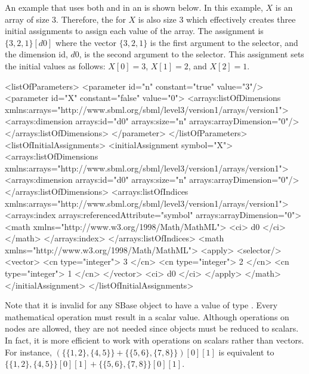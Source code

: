 An example that uses both  and  in an \InitialAssignment is shown below.   In this example, $X$ is an array of size 3.  Therefore, the \InitialAssignment for $X$ is also size 3 which effectively creates three initial assignments to assign each value of the array.  The assignment is $\{ 3, 2, 1 \}[d0]$ where the vector $\{ 3, 2, 1 \}$ is the first argument to the selector, and the \InitialAssignment dimension id, $d0$, is the second argument to the selector.  This assignment sets the initial values as follows: $X[0]=3$, $X[1]=2$, and $X[2]=1$.
\begin{example}[showstringspaces=false]
<listOfParameters>
  <parameter id="n" constant="true" value="3"/>
  <parameter id="X" constant="false" value="0">
    <arrays:listOfDimensions xmlns:arrays="http://www.sbml.org/sbml/level3/version1/arrays/version1">
      <arrays:dimension arrays:id="d0" arrays:size="n" arrays:arrayDimension="0"/>
    </arrays:listOfDimensions>
  </parameter>
</listOfParameters>
<listOfInitialAssignments>
  <initialAssignment symbol="X">
    <arrays:listOfDimensions xmlns:arrays="http://www.sbml.org/sbml/level3/version1/arrays/version1">
      <arrays:dimension arrays:id="d0" arrays:size="n" arrays:arrayDimension="0"/>
    </arrays:listOfDimensions>
    <arrays:listOfIndices xmlns:arrays="http://www.sbml.org/sbml/level3/version1/arrays/version1">
      <arrays:index arrays:referencedAttribute="symbol" arrays:arrayDimension="0">
        <math xmlns="http://www.w3.org/1998/Math/MathML">            
          <ci> d0 </ci>
        </math>
      </arrays:index>
    </arrays:listOfIndices>
    <math xmlns="http://www.w3.org/1998/Math/MathML">        
      <apply>
        <selector/>
        <vector>
          <cn type="integer"> 3 </cn>
          <cn type="integer"> 2 </cn>
          <cn type="integer"> 1 </cn>
        </vector>
        <ci> d0 </ci>
      </apply>
    </math>
  </initialAssignment>
</listOfInitialAssignments>
\end{example}
Note that it is invalid for any SBase object to have a value of type .  Every mathematical operation must result in a scalar value.  Although operations on  nodes are allowed, they are not needed since  objects must be reduced to scalars.  In fact, it is more efficient to work with operations on scalars rather than vectors. For instance, $(\{\{1,2\},\{4,5\}\}+\{\{5,6\},\{7,8\}\})[0][1]$ is equivalent to $\{\{1,2\},\{4,5\}\}[0][1] + \{\{5,6\},\{7,8\}\}[0][1]$.
